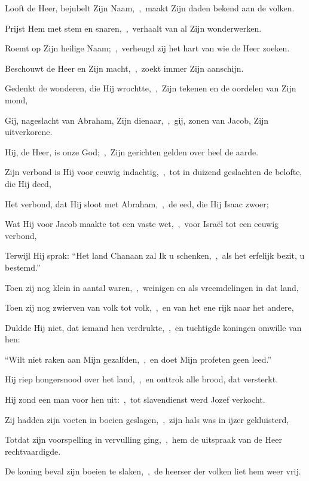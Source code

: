 \documentclass[12pt,twoside,a5paper]{article}
\begin{document}
\begin{halfparskip}
   Looft de Heer, bejubelt Zijn Naam,~\sep\ maakt Zijn daden bekend aan de volken.


  Prijst Hem met stem en snaren,~\sep\ verhaalt van al Zijn wonderwerken.

  Roemt op Zijn heilige Naam;~\sep\ verheugd zij het hart van wie de Heer zoeken.

  Beschouwt de Heer en Zijn macht,~\sep\ zoekt immer Zijn aanschijn.

  Gedenkt de wonderen, die Hij wrochtte,~\sep\ Zijn tekenen en de oordelen van Zijn mond,

  Gij, nageslacht van Abraham, Zijn dienaar,~\sep\ gij, zonen van Jacob, Zijn uitverkorene.

  Hij, de Heer, is onze God;~\sep\ Zijn gerichten gelden over heel de aarde.

  Zijn verbond is Hij voor eeuwig indachtig,~\sep\ tot in duizend geslachten de belofte, die Hij deed,

  Het verbond, dat Hij sloot met Abraham,~\sep\ de eed, die Hij Isaac zwoer;

  Wat Hij voor Jacob maakte tot een vaste wet,~\sep\ voor Israël tot een eeuwig verbond,

  Terwijl Hij sprak: ``Het land Chanaan zal Ik u schenken,~\sep\ als het erfelijk bezit, u bestemd.''

  Toen zij nog klein in aantal waren,~\sep\ weinigen en als vreemdelingen in dat land,

  Toen zij nog zwierven van volk tot volk,~\sep\ en van het ene rijk naar het andere,

  Duldde Hij niet, dat iemand hen verdrukte,~\sep\ en tuchtigde koningen omwille van hen:

  ``Wilt niet raken aan Mijn gezalfden,~\sep\ en doet Mijn profeten geen leed.''

  Hij riep hongersnood over het land,~\sep\ en onttrok alle brood, dat versterkt.

  Hij zond een man voor hen uit:~\sep\ tot slavendienst werd Jozef verkocht.

  Zij hadden zijn voeten in boeien geslagen,~\sep\ zijn hals was in ijzer gekluisterd,

  Totdat zijn voorspelling in vervulling ging,~\sep\ hem de uitspraak van de Heer rechtvaardigde.

  De koning beval zijn boeien te slaken,~\sep\ de heerser der volken liet hem weer vrij.


\end{halfparskip}
\end{document}
